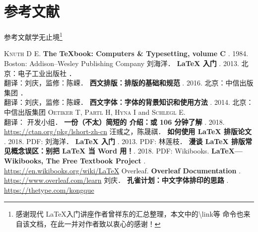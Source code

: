 \documentclass[fontset = none, t]{ctexbeamer}
\begin{document}
\section[参考文献]{参考文献}
\begin{frame}[fragile]{参考文献}{学无止境\footnote[frame,1]{感谢现代
      \LaTeX 入门讲座作者曾祥东的汇总整理，本文中的{\textbackslash link}等
      命令也来自该文档，在此一并对作者致以衷心的感谢！}}
\begin{multicols}{2}
\tiny
\newcommand\BOOK[1]{\textbf{#1}}
\newcommand\TAG[1]{\CASE{[#1]}}
\begin{thebibliography}{99}
  \bibitem{}
    \textsc{Knuth D E}.
    \newblock \BOOK{The \TeX book: Computers \& Typesetting, volume C} \TAG{M}. 1984.
    \newblock Boston: Addison--Wesley Publishing Company
  \bibitem{}
    刘海洋．
    \newblock \BOOK{\LaTeX{} 入门} \TAG{M}. 2013.
    \newblock 北京：电子工业出版社
  \bibitem{}
    ．\\
    翻译：刘庆，监修：陈嵘．
    \newblock \BOOK{西文排版：排版的基础和规范} \TAG{M}. 2016.
    \newblock 北京：中信出版集团
  \bibitem{}
    ．\\
    翻译：刘庆，监修：陈嵘．
    \newblock \BOOK{西文字体：字体的背景知识和使用方法} \TAG{M}. 2014.
    \newblock 北京：中信出版集团
  \bibitem{}
    \textsc{Oetiker T}, \textsc{Partl H}, \textsc{Hyna I} and \textsc{Schlegl E}.\\
    翻译：\CTeX{} 开发小组．
    \newblock \BOOK{一份（不太）简短的 \LaTeXe{} 介绍：或 106 分钟了解 \LaTeXe{}} \TAG{EB/OL}. 2018.
    \newblock \url{https://ctan.org/pkg/lshort-zh-cn}
  \bibitem{}
    汪彧之，陈晟祺．
    \newblock \BOOK{如何使用 \LaTeX{} 排版论文} \TAG{EB/OL}. 2018.
    \newblock PDF:
      \href{https://github.com/tuna/thulib-latex-talk/raw/master/latex-talk.pdf}{\faDownload}
  \bibitem{}
    刘海洋．
    \newblock \BOOK{\LaTeX{} 入门} \TAG{EB/OL}. 2013.
    \newblock PDF:
      \href{https://bbs.pku.edu.cn/attach/e7/f2/e7f2bb698b9c3672/tex_intro_talk.pdf}{\faDownload}
  \bibitem{}
    林莲枝．
    \newblock \BOOK{漫谈 \LaTeX{} 排版常见概念误区：别把 \LaTeX{} 当 Word 用！}\TAG{EB/OL}. 2018.
    \newblock PDF:
      \href{http://static.latexstudio.net/wp-content/uploads/2018/03/LianTze-presentation-0320-forReading.pdf}{\faDownload}
  \bibitem{}
    Wikibooks.
    \newblock \BOOK{\LaTeX{}---Wikibooks, The Free Textbook Project} \TAG{EB/OL}.
    \newblock \url{https://en.wikibooks.org/wiki/LaTeX}
  \bibitem{}
    Overleaf.
    \newblock \BOOK{Overleaf Documentation} \TAG{EB/OL}.
    \newblock \url{https://www.overleaf.com/learn}
  \bibitem{}
    刘庆．
    \newblock \BOOK{孔雀计划：中文字体排印的思路} \TAG{EB/OL}.
    \newblock \url{https://thetype.com/kongque}
\end{thebibliography}
\end{multicols}
\end{frame}
\end{document}
